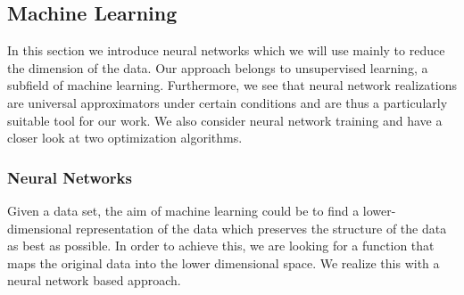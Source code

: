 \documentclass[11pt,titlepage]{article}
\theoremstyle{definition}
\theoremstyle{remark}
\begin{document}
	\subsection{Machine Learning}
	
	In this section we introduce neural networks which we will use mainly to reduce the dimension of the data. Our approach belongs to unsupervised learning, a subfield of machine learning. Furthermore, we see that neural network realizations are universal approximators under certain conditions and are thus a particularly suitable tool for our work. We also consider 
	neural network training and have a closer look at two optimization algorithms.
	
	\subsubsection{Neural Networks}\label{subsec NNs}
		
	Given a data set, the aim of machine learning could be to find a lower-dimensional representation of the data which preserves the structure of the data as best as possible. In order to achieve this, we are looking for a function that maps the original data into the lower dimensional space. We realize this with a neural network based approach.
	
\end{document}
